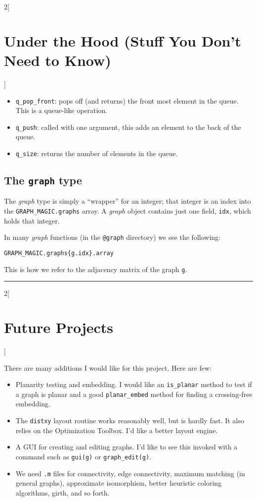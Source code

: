 \documentclass{amsart}
\begin{document}
\begin{multicols}{2}[\section{Under the Hood (Stuff You Don't Need to Know)}]
\begin{itemize}
\item \verb|q_pop_front|: pops off (and returns) the front most element in the
  queue. This is a queue-like operation.

\item \verb|q_push|: called with one argument, this adds an element to
  the back of the queue.

\item \verb|q_size|: returns the number of elements in the queue. 
\end{itemize}


\subsection{The \texttt{graph} type}

The \emph{graph} type is simply a ``wrapper'' for an integer; that
integer is an index into the \verb|GRAPH_MAGIC.graphs| array.  A
\emph{graph} object contains just one field, \verb|idx|, which holds
that integer.

In many \emph{graph} functions (in the \verb|@graph| directory) we see
the following:
\begin{verbatim}
GRAPH_MAGIC.graphs{g.idx}.array
\end{verbatim}
This is how we refer to the adjacency matrix of the graph \verb|g|.

\end{multicols}
\hrule
\begin{multicols}{2}[\section{Future Projects}]

There are many additions I would like for this project. Here are
few:
\begin{itemize}
\item Planarity testing and embedding. I would like an \verb|is_planar|
  method to test if a graph is planar and a good \verb|planar_embed|
  method for finding a crossing-free embedding.

\item The \verb|distxy| layout routine works reasonably well, but is
  hardly fast. It also relies on the  Optimization Toolbox. I'd like a
  better layout engine.

\item A GUI for creating and editing graphs. I'd like to see this
  invoked with a command such as \verb|gui(g)| or
  \verb|graph_edit(g)|.
  
\item We need \verb|.m| files for connectivity, edge connectivity,
  maximum matching (in general graphs), approximate
  isomorphism, better heuristic coloring algorithms, girth, and so
  forth.
\end{itemize}

\end{multicols}
\end{document}
